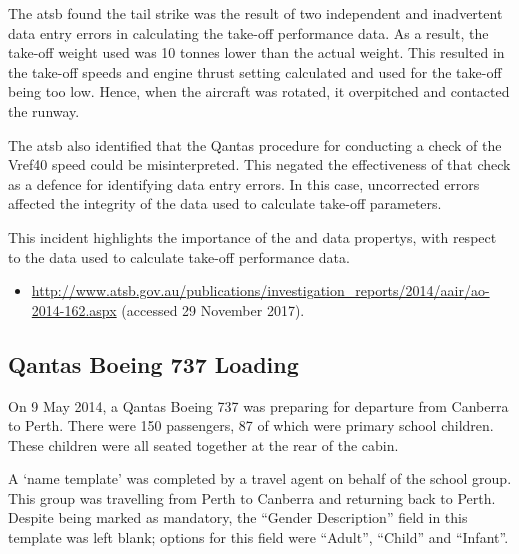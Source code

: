 The \gls{atsb} found the tail strike was the result of two independent and inadvertent data entry errors in calculating the take-off performance data. As a result, the take-off weight used was 10 tonnes lower than the actual weight. This resulted in the take-off speeds and engine thrust setting calculated and used for the take-off being too low. Hence, when the aircraft was rotated, it overpitched and contacted the runway.

The \gls{atsb} also identified that the Qantas procedure for conducting a check of the Vref40 speed could be misinterpreted. This negated the effectiveness of that check as a defence for identifying data entry errors. In this case, uncorrected errors affected the \gls{integrity} of the data used to calculate take-off parameters.

This incident highlights the importance of the  and  \glspl{data property}, with respect to the data used to calculate take-off performance data.

\begin{samepage}
\begin{itemize}
  \item \raggedright{\href{http://www.atsb.gov.au/publications/investigation_reports/2014/aair/ao-2014-162.aspx}{http://www.atsb.gov.au/publications/investigation\_reports/2014/aair/ao-2014-162.aspx} (accessed 29 November 2017).}
\end{itemize}
\end{samepage}


\subsection{Qantas Boeing 737 Loading} \label{bkm:incacc:qantasloading}
On 9 May 2014, a Qantas Boeing 737 was preparing for departure from Canberra to Perth. There were 150 passengers, 87 of which were primary school children. These children were all seated together at the rear of the cabin. 

A `name template' was completed by a travel agent on behalf of the school group. This group was travelling from Perth to Canberra and returning back to Perth. Despite being marked as mandatory, the ``Gender Description'' field in this template was left blank; options for this field were ``Adult'', ``Child'' and ``Infant''.

